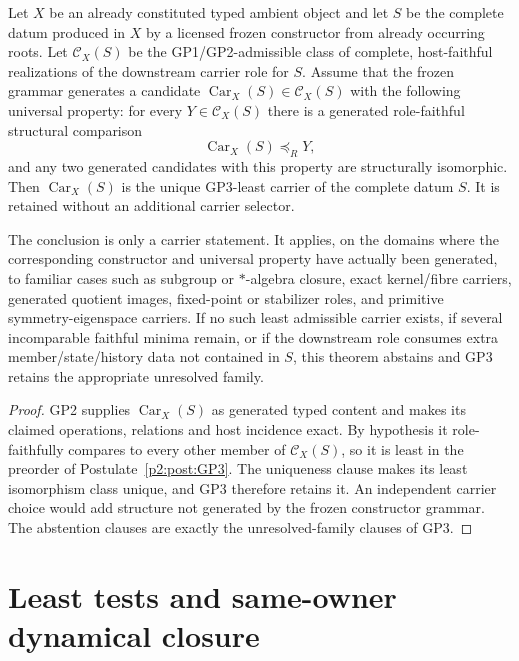 \documentclass[12pt,a4paper]{article}
\begin{document}
\begin{theorem}
\label{p2a:thm:generated-least-carrier}
Let $X$ be an already constituted typed ambient object and let $S$ be the
complete datum produced in $X$ by a licensed frozen constructor from already
occurring roots.  Let $\mathcal C_X(S)$ be the GP1/GP2-admissible class of
complete, host-faithful realizations of the downstream carrier role for $S$.
Assume that the frozen grammar generates a candidate
$\operatorname{Car}_X(S)\in\mathcal C_X(S)$ with the following universal
property: for every $Y\in\mathcal C_X(S)$ there is a generated role-faithful
structural comparison
\[
  \operatorname{Car}_X(S)\preceq_R Y,
\]
and any two generated candidates with this property are structurally
isomorphic.  Then $\operatorname{Car}_X(S)$ is the unique GP3-least carrier of
the complete datum $S$.  It is retained without an additional carrier
selector.

The conclusion is only a carrier statement.  It applies, on the domains where
the corresponding constructor and universal property have actually been
generated, to familiar cases such as subgroup or $*$-algebra closure,
exact kernel/fibre carriers, generated quotient images, fixed-point or
stabilizer roles, and primitive symmetry-eigenspace carriers.  If no such
least admissible carrier exists, if several incomparable faithful minima
remain, or if the downstream role consumes extra member/state/history data
not contained in $S$, this theorem abstains and GP3 retains the appropriate
unresolved family.
\end{theorem}

\begin{proof}
GP2 supplies $\operatorname{Car}_X(S)$ as generated typed content and makes
its claimed operations, relations and host incidence exact.  By hypothesis it
role-faithfully compares to every other member of $\mathcal C_X(S)$, so it is
least in the preorder of Postulate~\ref{p2:post:GP3}.  The uniqueness clause
makes its least isomorphism class unique, and GP3 therefore retains it.  An
independent carrier choice would add structure not generated by the frozen
constructor grammar.  The abstention clauses are exactly the unresolved-family
clauses of GP3.
\end{proof}


\section{Least tests and same-owner dynamical closure}
\label{paper2a:sec:organized-dynamics}
\end{document}

